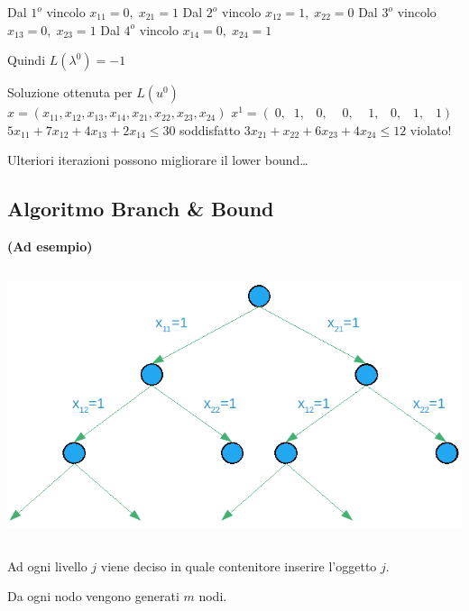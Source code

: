 Dal $1^{o}$ vincolo $x_{11}=0,\;x_{21}=1$\newline
Dal $2^{o}$ vincolo $x_{12}=1,\;x_{22}=0$\newline
Dal $3^{o}$ vincolo $x_{13}=0,\;x_{23}=1$\newline
Dal $4^{o}$ vincolo $x_{14}=0,\;x_{24}=1$\newline

Quindi $L(\lambda^{0})=-1$

Soluzione ottenuta per $L(u^{0})$\\
$x=(x_{11},x_{12},x_{13},x_{14},x_{21},x_{22},x_{23},x_{24})$\newline
$x^{1}=(\;0,\;\;1,\;\;\;0,\;\;\;\;0,\;\;\;\;1,\;\;\;0,\;\;\;1,\;\;\;1)$\newline\newline
$5x_{11}+7x_{12}+4x_{13}+2x_{14}\le 30$ soddisfatto\newline
$3x_{21}+x_{22}+6x_{23}+4x_{24}\le 12$ violato!

Ulteriori iterazioni possono migliorare il lower bound\dots

\subsection{Algoritmo Branch \& Bound}
\textbf{(Ad esempio)}

\centerline{\includegraphics[height=8cm]{images/graph26.png}}
Ad ogni livello $j$ viene deciso in quale contenitore inserire l'oggetto $j$.

Da ogni nodo vengono generati $m$ nodi.